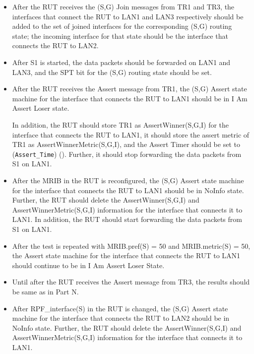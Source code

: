 \documentclass[11pt]{report}
\begin{document}

\begin{itemize}

  \item After the RUT receives the (S,G) Join messages from TR1 and TR3, the
  interfaces that connect the RUT to LAN1 and LAN3 respectively should be
  added to the set of joined interfaces for the corresponding (S,G) routing
  state; the incoming interface for that state should be the interface that
  connects the RUT to LAN2.

  \item After S1 is started, the data packets should be forwarded on LAN1 and
  LAN3, and the SPT bit for the (S,G) routing state should be set.

  \item After the RUT receives the Assert message from TR1, the (S,G)
  Assert state machine for the interface that connects the RUT to LAN1 should
  be in I Am Assert Loser state.

  In addition, the RUT should store TR1 as AssertWinner(S,G,I) for the
  interface that connects the RUT to LAN1, it should store the assert metric
  of TR1 as AssertWinnerMetric(S,G,I), and the Assert Timer should be set to
  (\verb=Assert_Time=) ({\PimsmAssertTime}).
  Further, it should stop forwarding the data packets from S1 on LAN1.

  \item After the MRIB in the RUT is reconfigured, the (S,G)
  Assert state machine for the interface that connects the RUT to LAN1 should
  be in NoInfo state.
  Further, the RUT should delete the AssertWinner(S,G,I) and
  AssertWinnerMetric(S,G,I) information for the interface that connects it to
  LAN1.
  In addition, the RUT should start forwarding the data packets from S1 on
  LAN1.

  \item After the test is repeated with MRIB.pref(S) = 50 and  MRIB.metric(S)
  = 50, the Assert state machine for the interface that connects the RUT to
  LAN1 should continue to be in I Am Assert Loser State.

\end{itemize}


\begin{itemize}

  \item Until after the RUT receives the Assert message from TR3, the
  results should be same as in Part N.

  \item After RPF\_interface(S) in the RUT is changed, the (S,G)
  Assert state machine for the interface that connects the RUT to LAN2 should
  be in NoInfo state.
  Further, the RUT should delete the AssertWinner(S,G,I) and
  AssertWinnerMetric(S,G,I) information for the interface that connects it to
  LAN1.

\end{itemize}
\end{document}
